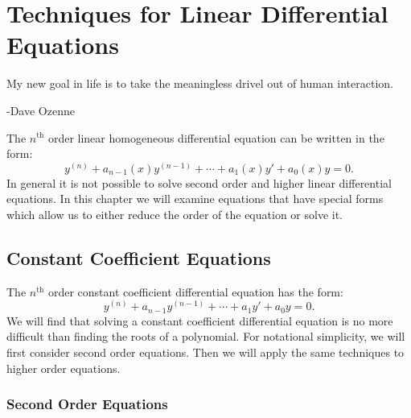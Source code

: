 \flushbottom




\chapter{Techniques for Linear Differential Equations}
\label{chapter_tflo}



My new goal in life is to take the meaningless drivel out of human interaction.

\begin{flushright}
  -Dave Ozenne
\end{flushright}




The $n^{\mathrm{th}}$ order linear homogeneous differential equation
can be written in the form:
\[
y^{(n)} + a_{n-1}(x) y^{(n-1)} + \cdots + a_1(x) y' + a_0(x) y = 0.
\]
In general it is not possible to solve second order and higher linear
differential equations.  In this chapter we will examine equations that have 
special forms which allow us to either reduce the order of the equation or 
solve it.





\section{Constant Coefficient Equations}


The $n^{\mathrm{th}}$ order constant coefficient differential equation
has the form:
\[
y^{(n)} + a_{n-1} y^{(n-1)} + \cdots + a_1 y' + a_0 y = 0.
\]
We will find that solving a constant coefficient differential equation is 
no more difficult than finding the roots of a polynomial.  For notational 
simplicity, we will first consider second order equations.  Then we will 
apply the same techniques to higher order equations.



\subsection{Second Order Equations}





